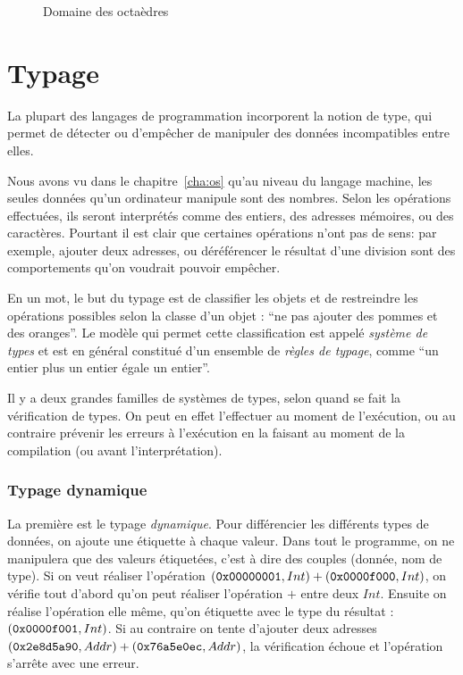 \begin{figure}%
  \centering

  \caption{Domaine des octaèdres}
  \label{fig:dom-octo}
\end{figure}%

\section{Typage}

La plupart des langages de programmation incorporent la notion de type, qui
permet de détecter ou d'empêcher de manipuler des données incompatibles entre
elles.

Nous avons vu dans le chapitre~\ref{cha:os} qu'au niveau du langage machine, les
seules données qu'un ordinateur manipule sont des nombres. Selon les opérations
effectuées, ils seront interprétés comme des entiers, des adresses mémoires, ou
des caractères. Pourtant il est clair que certaines opérations n'ont pas de
sens: par exemple, ajouter deux adresses, ou déréférencer le résultat d'une
division sont des comportements qu'on voudrait pouvoir empêcher.

En un mot, le but du typage est de classifier les objets et de restreindre les
opérations possibles selon la classe d'un objet : ``ne pas ajouter des pommes et
des oranges''. Le modèle qui permet cette classification est appelé
\emph{système de types} et est en général constitué d'un ensemble de
\emph{règles de typage}, comme ``un entier plus un entier égale un entier''.

Il y a deux grandes familles de systèmes de types, selon quand se fait la
vérification de types. On peut en effet l'effectuer au moment de l'exécution, ou
au contraire prévenir les erreurs à l'exécution en la faisant au moment de la
compilation (ou avant l'interprétation).

\subsubsection{Typage dynamique}

La première est le typage \emph{dynamique}. Pour différencier les différents
types de données, on ajoute une étiquette à chaque valeur. Dans tout le
programme, on ne manipulera que des valeurs étiquetées, c'est à dire des couples
(donnée, nom de type). Si on veut réaliser l'opération $(\texttt{0x00000001}, Int) +
(\texttt{0x0000f000}, Int)$, on vérifie tout d'abord qu'on peut réaliser l'opération
$+$ entre deux $Int$. Ensuite on réalise l'opération elle même, qu'on étiquette
avec le type du résultat : $(\texttt{0x0000f001}, Int)$. Si au contraire on tente
d'ajouter deux adresses $(\texttt{0x2e8d5a90}, Addr) + (\texttt{0x76a5e0ec}, Addr)$, la
vérification échoue et l'opération s'arrête avec une erreur.

